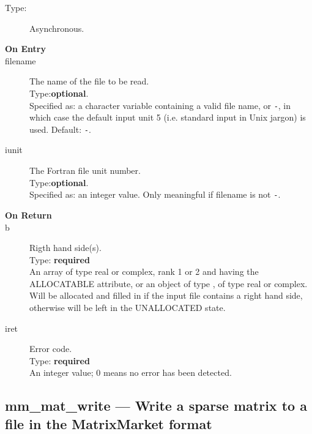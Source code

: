 \begin{description}
\item[Type:] Asynchronous.
\item[\bf  On Entry ]
\item[filename] The name of the file to be read.\\
Type:{\bf optional}.\\
Specified as: a character variable containing a valid file name, or
\verb|-|, in which case the default input unit  5 (i.e. standard input
in Unix jargon) is used. Default: \verb|-|. 
\item[iunit] The Fortran file unit number.\\
Type:{\bf optional}.\\
Specified as: an integer value. Only meaningful if filename is not \verb|-|.
\end{description}

\begin{description}
\item[\bf On Return]
\item[b] Rigth hand side(s).\\
Type: {\bf required} \\
An  array of type real or complex, rank 1 or 2 and having the ALLOCATABLE
attribute, or an
object of type \vdata, of type real or complex.\\
Will be allocated and filled in if the input file contains
a right hand side, otherwise will be left in the UNALLOCATED state. \\
\item[iret] Error code.\\
Type: {\bf required} \\
An integer value; 0 means no error has been detected. 
\end{description}



\clearpage\subsection{mm\_mat\_write --- Write a sparse matrix to a
  file in the MatrixMarket format}


